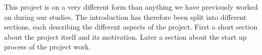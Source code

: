 This project is on a very different form than anything we have previously worked on during our studies.
The introduction has therefore been split into different sections, each describing the different aspects of the project.
First a short section about the project itself and its motivation.
Later a section about the start up process of the project work.